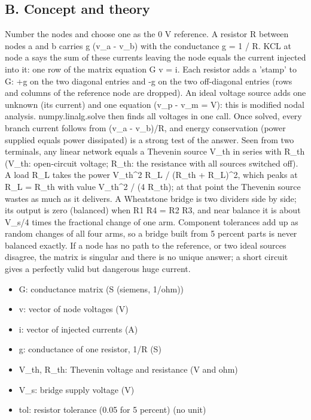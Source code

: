 \documentclass[11pt,a4paper]{article}
\begin{document}
\subsection*{B. Concept and theory}
Number the nodes and choose one as the 0 V reference. A resistor R between nodes a and b carries g (v\_a - v\_b) with the conductance g = 1 / R. KCL at node a says the sum of these currents leaving the node equals the current injected into it: one row of the matrix equation G v = i. Each resistor adds a 'stamp' to G: +g on the two diagonal entries and -g on the two off-diagonal entries (rows and columns of the reference node are dropped). An ideal voltage source adds one unknown (its current) and one equation (v\_p - v\_m = V): this is modified nodal analysis. numpy.linalg.solve then finds all voltages in one call. Once solved, every branch current follows from (v\_a - v\_b)/R, and energy conservation (power supplied equals power dissipated) is a strong test of the answer. Seen from two terminals, any linear network equals a Thevenin source V\_th in series with R\_th (V\_th: open-circuit voltage; R\_th: the resistance with all sources switched off). A load R\_L takes the power V\_th\textasciicircum{}2 R\_L / (R\_th + R\_L)\textasciicircum{}2, which peaks at R\_L = R\_th with value V\_th\textasciicircum{}2 / (4 R\_th); at that point the Thevenin source wastes as much as it delivers. A Wheatstone bridge is two dividers side by side; its output is zero (balanced) when R1 R4 = R2 R3, and near balance it is about V\_s/4 times the fractional change of one arm. Component tolerances add up as random changes of all four arms, so a bridge built from 5 percent parts is never balanced exactly. If a node has no path to the reference, or two ideal sources disagree, the matrix is singular and there is no unique answer; a short circuit gives a perfectly valid but dangerous huge current.

\begin{itemize}[nosep]
\item G: conductance matrix (S (siemens, 1/ohm))
\item v: vector of node voltages (V)
\item i: vector of injected currents (A)
\item g: conductance of one resistor, 1/R (S)
\item V\_th, R\_th: Thevenin voltage and resistance (V and ohm)
\item V\_s: bridge supply voltage (V)
\item tol: resistor tolerance (0.05 for 5 percent) (no unit)
\end{itemize}
\end{document}
